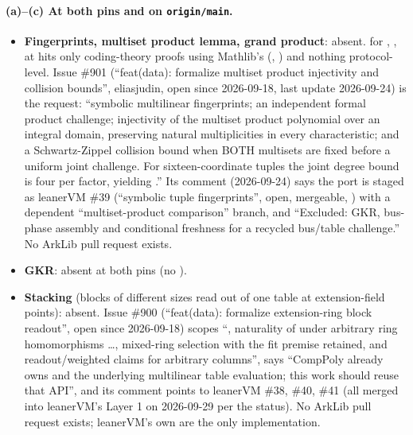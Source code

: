\paragraph{(a)--(c) At both pins and on \texttt{origin/main}.}
\begin{itemize}
\item \textbf{Fingerprints, multiset product lemma, grand product}: absent. 
  for , ,  at  hits
  only coding-theory proofs using Mathlib's 
  (, ) and
  nothing protocol-level. Issue \#901 (``feat(data): formalize multiset product injectivity and
  collision bounds'', eliasjudin, open since 2026-09-18, last update 2026-09-24) is the request:
  ``symbolic multilinear fingerprints; an independent formal product challenge; injectivity of
  the multiset product polynomial over an integral domain, preserving natural multiplicities in
  every characteristic; and a Schwartz-Zippel collision bound when BOTH multisets are fixed
  before a uniform joint challenge. For sixteen-coordinate tuples the joint degree bound is four
  per factor, yielding .'' Its comment (2026-09-24) says the port is staged
  as leanerVM \#39 (``symbolic tuple fingerprints'', open, mergeable,
  ) with a dependent ``multiset-product
  comparison'' branch, and ``Excluded: GKR, bus-phase assembly and conditional freshness for a
  recycled bus/table challenge.'' No ArkLib pull request exists.
\item \textbf{GKR}: absent at both pins (no ).
\item \textbf{Stacking} (blocks of different sizes read out of one table at extension-field
  points): absent. Issue \#900 (``feat(data): formalize extension-ring block readout'', open
  since 2026-09-18) scopes ``, naturality of  under arbitrary ring
  homomorphisms \ldots, mixed-ring selection with the fit premise retained, and readout/weighted
  claims for arbitrary columns'', says ``CompPoly already owns  and the underlying
  multilinear table evaluation; this work should reuse that API'', and its comment points to
  leanerVM \#38, \#40, \#41 (all merged into leanerVM's Layer 1 on 2026-09-29 per the status). No
  ArkLib pull request exists; leanerVM's own 
  are the only implementation.

\end{itemize}
